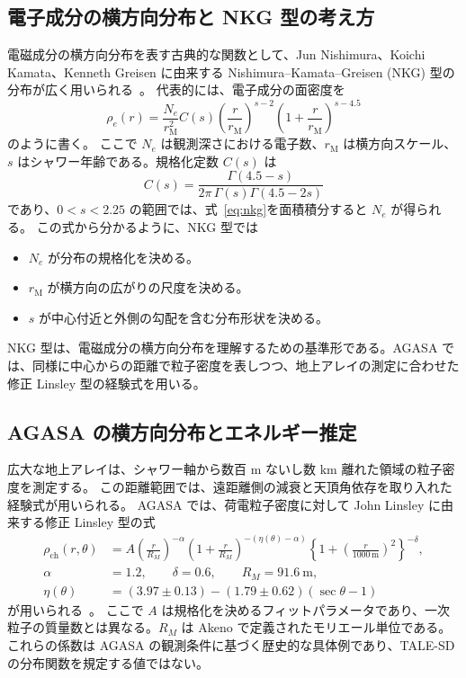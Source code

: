 \documentclass[book,paper=a4,fontsize=11pt]{jlreq}
\begin{document}
\subsection{電子成分の横方向分布と NKG 型の考え方}\label{subsec:nkg}
電磁成分の横方向分布を表す古典的な関数として、Jun Nishimura、Koichi Kamata、Kenneth Greisen に由来する Nishimura--Kamata--Greisen (NKG) 型の分布が広く用いられる~\cite{KamataNishimura1958,Greisen1960}。
代表的には、電子成分の面密度を
\begin{equation}
  \rho_e(r)
  =
  \frac{N_e}{r_{\mathrm{M}}^2}
  C(s)
  \left(\frac{r}{r_{\mathrm{M}}}\right)^{s-2}
  \left(1+\frac{r}{r_{\mathrm{M}}}\right)^{s-4.5}
  \label{eq:nkg}
\end{equation}
のように書く。
ここで \(N_e\) は観測深さにおける電子数、\(r_{\mathrm{M}}\) は横方向スケール、\(s\) はシャワー年齢である。規格化定数 \(C(s)\) は
\begin{equation}
  C(s)=\frac{\Gamma(4.5-s)}{2\pi\,\Gamma(s)\Gamma(4.5-2s)}
\end{equation}
であり、\(0<s<2.25\) の範囲では、式~\eqref{eq:nkg}を面積積分すると \(N_e\) が得られる。
この式から分かるように、NKG 型では
\begin{itemize}
  \item \(N_e\) が分布の規格化を決める。
  \item \(r_{\mathrm{M}}\) が横方向の広がりの尺度を決める。
  \item \(s\) が中心付近と外側の勾配を含む分布形状を決める。
\end{itemize}
NKG 型は、電磁成分の横方向分布を理解するための基準形である。AGASA では、同様に中心からの距離で粒子密度を表しつつ、地上アレイの測定に合わせた修正 Linsley 型の経験式を用いる。

\subsection{AGASA の横方向分布とエネルギー推定}\label{subsec:agasa_ldf}
広大な地上アレイは、シャワー軸から数百 \(\mathrm{m}\) ないし数 \(\mathrm{km}\) 離れた領域の粒子密度を測定する。
この距離範囲では、遠距離側の減衰と天頂角依存を取り入れた経験式が用いられる。
AGASA では、荷電粒子密度に対して John Linsley に由来する修正 Linsley 型の式
\begin{align}
  \rho_{\mathrm{ch}}(r,\theta)
  &=
  A
  \left(\frac{r}{R_M}\right)^{-\alpha}
  \left(1+\frac{r}{R_M}\right)^{-(\eta(\theta)-\alpha)}
  \left\{1+\left(\frac{r}{1000\,\mathrm{m}}\right)^2\right\}^{-\delta},
  \label{eq:agasa_ldf}
  \\
  \alpha &= 1.2,\qquad
  \delta = 0.6,\qquad
  R_M = 91.6\ \mathrm{m}, \nonumber\\
  \eta(\theta)
  &= (3.97\pm0.13) - (1.79\pm0.62)(\sec\theta-1) \nonumber
\end{align}
が用いられる~\cite{Teshima1986,Yoshida1994}。
ここで \(A\) は規格化を決めるフィットパラメータであり、一次粒子の質量数とは異なる。\(R_M\) は Akeno で定義されたモリエール単位である。これらの係数は AGASA の観測条件に基づく歴史的な具体例であり、TALE-SD の分布関数を規定する値ではない。
\end{document}
